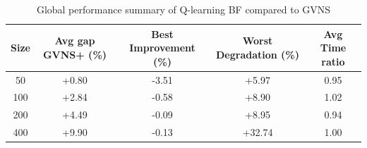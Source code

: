\begin{table}[ht]
\centering
\footnotesize
\setlength{\tabcolsep}{4pt}
\caption{Global performance summary of Q-learning BF compared to GVNS}
\vspace{3mm}
\begin{tabular}{c c c c c}
\toprule
\textbf{Size} & \textbf{Avg gap GVNS+ (\%)} & \textbf{Best Improvement (\%)} & \textbf{Worst Degradation (\%)} & \textbf{Avg Time ratio} \\
\midrule
50  & +0.80 & -3.51 & +5.97  & 0.95 \\
100 & +2.84 & -0.58 & +8.90  & 1.02 \\
200 & +4.49 & -0.09 & +8.95  & 0.94 \\
400 & +9.90 & -0.13 & +32.74 & 1.00 \\
\bottomrule
\end{tabular}
\label{tab:qlearning_bf_summary}
\end{table}